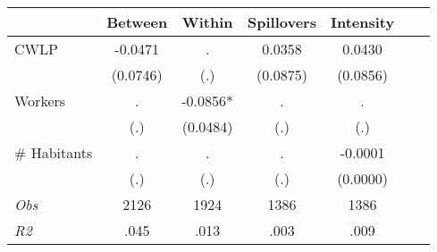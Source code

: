 \begin{tabular}{l*{6}{c}}\hline&\multicolumn{1}{c}{Between}&\multicolumn{1}{c}{Within}&\multicolumn{1}{c}{Spillovers}&\multicolumn{1}{c}{Intensity}\\ \hline 
CWLP & -0.0471 & . & 0.0358 & 0.0430 \\
 & (0.0746) & (.) & (0.0875) & (0.0856) \\
Workers & . & -0.0856* & . & . \\
 & (.) & (0.0484) & (.) & (.) \\
\# Habitants & . & . & . & -0.0001 \\
  & (.) & (.) & (.) & (0.0000) \\
\hline \textit{Obs} & 2126 & 1924 & 1386 & 1386  \\ \textit{R2} & .045 & .013 & .003 & .009 \\ \hline \end{tabular}
